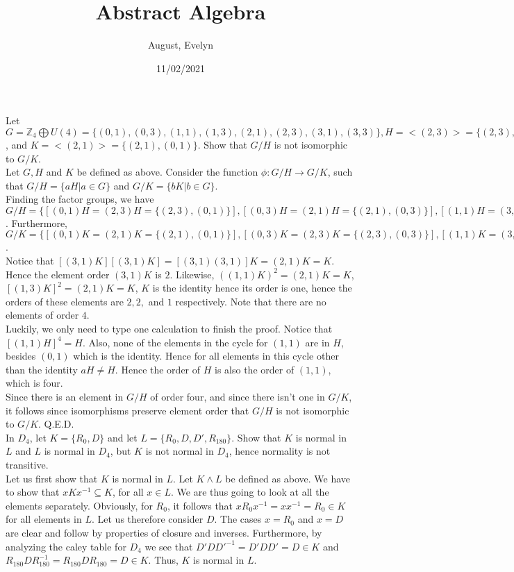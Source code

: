 \documentclass{article}
\title{Abstract Algebra}
\author{August, Evelyn}
\date{11/02/2021}
\newcommand{\and}{\wedge}
\newcommand{\Z}{\mathbb{Z}}
\begin{document}
\maketitle

 Let $G=\Z_4 \bigoplus U(4)=\{(0,1),(0,3),(1,1),(1,3),(2,1),(2,3),(3,1),(3,3)\}, H=<(2,3)>=\{(2,3), (0,1)\}$, and $K=<(2,1)>=\{(2,1), (0,1)\}$. Show that $G/H$ is not isomorphic to $G/K$. \\

 Let $G, H$ and $K$ be defined as above. Consider the function $\phi: G/H \longrightarrow G/K$, such that $G/H=\{aH|a \in G\}$ and $G/K=\{bK|b \in G\}$. \\
Finding the factor groups, we have $G/H = \{[(0,1)H= (2,3)H= \{(2,3),(0,1)\}],[(0,3)H = (2,1)H =  \{(2,1),(0,3)\}], [(1,1)H = (3,3)H \{(3,3),(1,1)\}],[(1,3)H =(3,1)H =  \{(3,1),(1,3)\}]\}$. Furthermore, $G/K = \{[(0,1)K = (2,1)K = \{(2,1),(0,1)\}], [(0,3)K = (2,3)K = \{(2,3),(0,3)\}], [(1,1)K = (3,1)K = \{(1,1),(3,1)\}],[(1,3)K = (3,3)K = \{(1,3),(3,3)\}]\}$.\\

Notice that $[(3,1)K][(3,1)K] = [(3,1)(3,1)]K = (2,1)K = K$. Hence the element order $(3,1)K$ is $2$. Likewise, $((1,1)K)^2 = (2,1)K = K$, $[(1,3)K]^2 = (2,1)K = K $, $K$ is the identity hence its order is one, hence the orders of these elements are $2, 2,$ and $1$ respectively. Note that there are no elements of order $4$.\\

Luckily, we only need to type one calculation to finish the proof. Notice that $[(1,1)H]^4 = H$. Also, none of the elements in the cycle for $(1,1)$ are in $H$, besides $(0,1)$ which is the identity. Hence for all elements in this cycle other than the identity $aH \ne H$. Hence the order of $H$ is also the order of $(1,1)$, which is four.\\

Since there is an element in $G/H$ of order four, and since there isn't one in $G/K$, it follows since isomorphisms preserve element order that $G/H$ is not isomorphic to $G/K$.
Q.E.D.
\\
\newpage
{} In $D_4$, let $K=\{R_0, D\}$ and let $L=\{R_0, D, D', R_{180}\}$. Show that $K$ is normal in $L$ and $L$ is normal in $D_4$, but $K$ is not normal in $D_4$, hence normality is not transitive.\\

 Let us first show that $K$ is normal in $L$. Let $K \and L$ be defined as above. We have to show that $xKx^{-1} \subseteq K$, for all $x \in L$. We are thus going to look at all the elements separately. Obviously, for $R_0$, it follows that $xR_0x^{-1}=xx^{-1}=R_0 \in K$ for all elements in $L$. Let us therefore consider $D$. The cases $x=R_0$ and $x=D$ are clear and follow by properties of closure and inverses. Furthermore, by analyzing the caley table for $D_4$ we see that $D'DD'^{-1}=D'DD'=D \in K$ and $R_{180}DR_{180}^{-1}=R_{180}DR_{180}=D \in K$. Thus, $K$ is normal in $L$.\\
\end{document}
